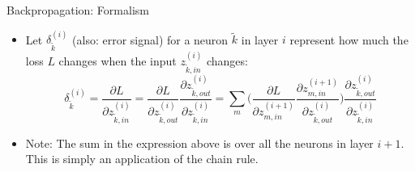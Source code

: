 \begin{vbframe} {Backpropagation: Formalism}

  \vspace*{-0.3cm}

 \begin{figure}
  \centering
  \end{figure}

  \vspace*{-0.5cm}

  \begin{small}
  \begin{itemize}
    \item Let $\delta_{\tilde{k}}^{(i)}$ (also: error signal) for a neuron $\tilde{k}$ in layer $i$ represent how much the loss $L$ changes when the input $z_{\tilde{k},in}^{(i)}$   changes:
    {\small
      $$\delta_{\tilde{k}}^{(i)} = \frac{\partial L}{\partial z_{\tilde{k},in}^{(i)}} =  \frac{\partial L}{\partial z_{\tilde{k},out}^{(i)}} \frac{\partial z_{\tilde{k},out}^{(i)}}{\partial z_{\tilde{k},in}^{(i)}}   =  \sum_m \Bigg( \frac{\partial L}{\partial z_{m,in}^{(i+1)}} \frac{\partial z_{m,in}^{(i+1)}}{\partial z_{\tilde{k},out}^{(i)}} \Bigg) \frac{\partial z_{\tilde{k},out}^{(i)}}{\partial z_{\tilde{k},in}^{(i)}} $$}
    \item Note: The sum in the expression above is over all the neurons in layer $i+1$. This is simply an application of the chain rule.
  \end{itemize}
  \end{small}


\end{vbframe}
